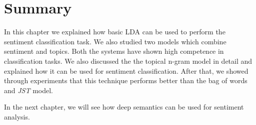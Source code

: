 \section*{Summary}
In this chapter we explained how basic LDA can be used to perform the sentiment classification task. We also studied two models which combine sentiment
and topics. Both the systems have shown high competence in classification tasks. We also discussed the the topical n-gram model in detail and explained 
how it can be used for sentiment classification. After that, we showed through experiments that this technique performs better than the bag of words and
\textit{JST} model. 

In the next chapter, we will see how deep semantics can be used for sentiment analysis.

\clearpage